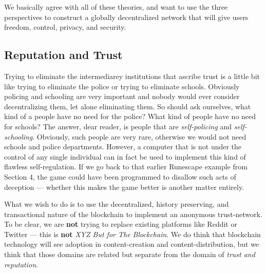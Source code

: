 \documentclass[a4paper]{article}
\begin{document}
We basically agree with all of these theories, and want to use the three perspectives to construct a globally decentralized network that will give users freedom, control, privacy, and security.
\subsection{Reputation and Trust}
\label{Reputation and Trust}

Trying to eliminate the intermediarey institutions that ascribe trust is a little bit like trying to eliminate the police or trying to eliminate schools. Obviously policing and schooling are very important and nobody would ever consider decentralizing them, let alone eliminating them. So should ask ourselves, what kind of a people have no need for the police? What kind of people have no need for schools? The answer, dear reader, is people that are \emph{self-policing} and \emph{self-schooling}. Obviously, such people are very rare, otherwise we would not need schools and police departments. However, a computer that is not under the control of any single individual can in fact be used to implement this kind of flawless self-regulation. If we go back to that earlier Runescape example from Section 4, the game could have been programmed to disallow such acts of deception ---  whether this makes the game better is another matter entirely.

What we wish to do is to use the decentralized, history preserving, and transactional nature of the blockchain to implement an anonymous trust-network. To be clear, we are \textbf{not} trying to replace existing platforms like Reddit or Twitter ---  this is \textbf{not} \emph{XYZ But for The Blockchain}. We do think that blockchain technology will see adoption in content-creation and content-distribution, but we think that those domains are related but separate from the domain of \emph{trust and reputation}.
\end{document}
